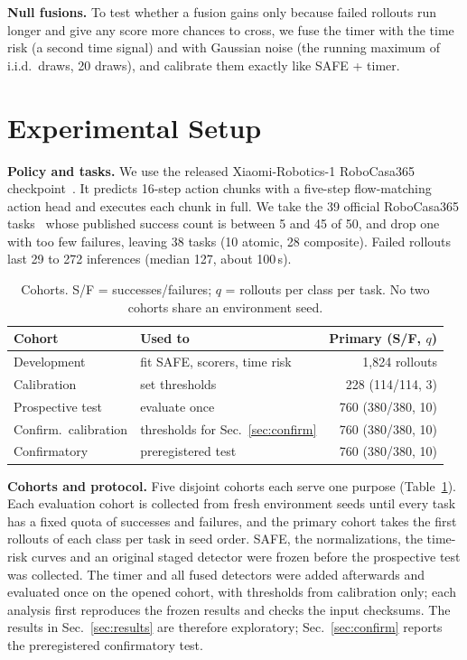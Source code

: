 \documentclass[10pt,a4paper,twocolumn]{article}
\begin{document}
\textbf{Null fusions.} To test whether a fusion gains only because failed rollouts run
longer and give any score more chances to cross, we fuse the timer with the time risk (a
second time signal) and with Gaussian noise (the running maximum of i.i.d.\ draws, 20 draws),
and calibrate them exactly like SAFE + timer.

\section{Experimental Setup}

\textbf{Policy and tasks.} We use the released Xiaomi-Robotics-1 RoboCasa365
checkpoint~\cite{xiaomi2026robotics}. It predicts 16-step action chunks with a five-step
flow-matching action head and executes each chunk in full. We take the 39 official
RoboCasa365 tasks~\cite{nasiriany2024robocasa,robocasa365} whose published success count is
between 5 and 45 of 50, and drop one with too few failures, leaving 38 tasks (10 atomic, 28
composite). Failed rollouts last 29 to 272 inferences (median 127, about 100\,s).

\begin{table}[t]
\centering
\caption{Cohorts. S/F = successes/failures; $q$ = rollouts per class per task. No two
cohorts share an environment seed.}
\label{tab:cohorts}
\footnotesize
\begin{tabular}{@{}llr@{}}
\toprule
Cohort & Used to & Primary (S/F, $q$) \\
\midrule
Development & fit SAFE, scorers, time risk & 1,824 rollouts \\
Calibration & set thresholds & 228 (114/114, 3) \\
Prospective test & evaluate once & 760 (380/380, 10) \\
Confirm.\ calibration & thresholds for Sec.~\ref{sec:confirm} & 760 (380/380, 10) \\
Confirmatory & preregistered test & 760 (380/380, 10) \\
\bottomrule
\end{tabular}
\end{table}

\textbf{Cohorts and protocol.} Five disjoint cohorts each serve one purpose
(Table~\ref{tab:cohorts}). Each evaluation cohort is collected from fresh environment seeds
until every task has a fixed quota of successes and failures, and the primary cohort takes
the first rollouts of each class per task in seed order. SAFE, the normalizations, the
time-risk curves and an original staged detector were frozen before the prospective test
was collected. The timer and all fused detectors were added afterwards and evaluated once
on the opened cohort, with thresholds from calibration only; each analysis first reproduces
the frozen results and checks the input checksums. The results in Sec.~\ref{sec:results} are
therefore exploratory; Sec.~\ref{sec:confirm} reports the preregistered confirmatory test.
\end{document}
